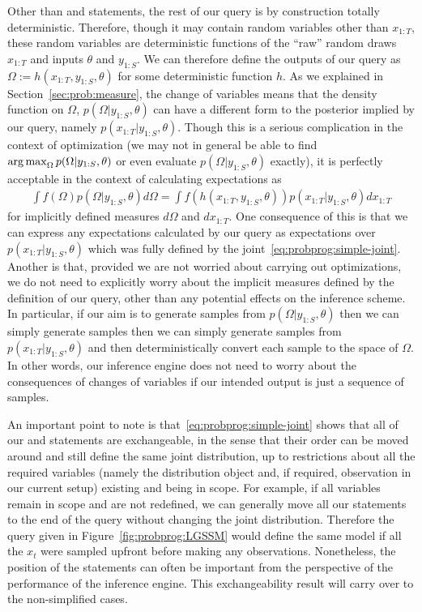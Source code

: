 Other than \sample and \observe statements, the rest of our query is by construction totally deterministic.  Therefore,
though it may contain random variables other than $x_{1:T}$, these random variables are deterministic
functions of the ``raw'' random draws $x_{1:T}$ and inputs $\theta$ and $y_{1:S}$.  We can therefore 
define the outputs of our query as $\Omega := h(x_{1:T},y_{1:S},\theta)$ for some deterministic function $h$.
As we explained in Section~\ref{sec:prob:measure}, the change of variables means that the density function on $\Omega$,
$p(\Omega | y_{1:S}, \theta) $
can have a different form to the posterior implied by our query, namely $p(x_{1:T} | y_{1:S}, \theta)$.
  Though this is a serious complication in the
context of optimization (we may not in general be able to find $\operatorname*{arg\,max}_{\Omega} p(\Omega|y_{1:S},\theta)$
or even evaluate $p(\Omega | y_{1:S}, \theta)$ exactly), it
is perfectly acceptable in the context of calculating expectations as
\begin{align}
\int f(\Omega) p(\Omega | y_{1:S}, \theta) d\Omega = \int f(h(x_{1:T}, y_{1:S}, \theta)) p(x_{1:T} | y_{1:S}, \theta) dx_{1:T}
\end{align}
for implicitly defined measures $d\Omega$ and $dx_{1:T}$.  One consequence of this is that
we can express any expectations calculated by our query as expectations over $p(x_{1:T} | y_{1:S}, \theta)$
which was fully defined by the joint~\eqref{eq:probprog:simple-joint}.  Another is that, provided we are not worried
about carrying out optimizations, we do not need to explicitly worry about the implicit measures defined
by the definition of our query, other than any potential effects on the inference scheme.  In particular,
if our aim is to generate samples from $p(\Omega | y_{1:S}, \theta)$ then we can simply generate samples then
we can simply generate samples from $p(x_{1:T} | y_{1:S}, \theta)$ and then deterministically convert each
sample to the space of $\Omega$.  In other words, our inference engine does not need to worry about
the consequences of changes of variables if our intended output is just a sequence of samples.

An important point to note is that~\eqref{eq:probprog:simple-joint} shows that all of our \sample
and \observe statements are exchangeable, in the sense that their order can be moved around and
still define the same joint distribution, up to restrictions about all the required variables (namely the
distribution object and, if required, observation in our current setup) existing and being in scope.  
For example, if all variables remain in scope
and are not redefined, we can generally move all our \observe statements to the end of the query
without changing the joint distribution.  Therefore the query given in Figure~\ref{fig:probprog:LGSSM}
would define the same model if all the $x_t$ were sampled upfront before making any observations.
Nonetheless, the position of the \observe statements
can often be important from the perspective of the performance of the inference engine.  This exchangeability
result will carry over to the non-simplified cases.


